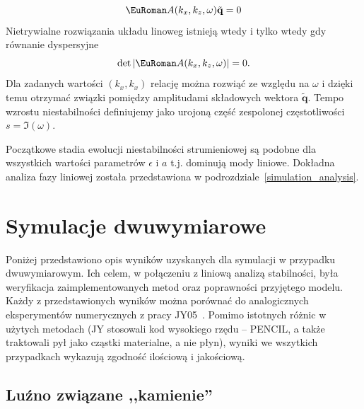 \begin{equation}
 \eurom{A}(k_x,k_z,\omega)\tilde{\mathbf{q}} = 0
 \label{eq:linset}
\end{equation}
%
Nietrywialne rozwiązania układu linoweg  istnieją wtedy i tylko
wtedy gdy równanie dyspersyjne 
\begin{equation}
 \det|\eurom{A}(k_x,k_z,\omega)|=0.
 \label{eq:disprel}
\end{equation}
%
Dla zadanych wartości $(k_x, k_x)$ relację  można rozwiąć ze
względu na $\omega$ i dzięki temu otrzymać związki pomiędzy amplitudami
składowych wektora $\tilde{\mathbf{q}}$.
Tempo wzrostu niestabilności definiujemy jako urojoną część zespolonej
częstotliwości $s=\Im(\omega)$.
%

Początkowe stadia ewolucji niestabilności strumieniowej są podobne dla
wszystkich wartości parametrów $\epsilon$ i $a$ t.j. dominują mody liniowe.
Dokładna analiza fazy liniowej została przedstawiona w
podrozdziale~\ref{simulation_analysis}.


\section{Symulacje dwuwymiarowe}
Poniżej przedstawiono opis wyników uzyskanych dla symulacji w przypadku
dwuwymiarowym. Ich celem, w połączeniu z liniową analizą stabilności, była
weryfikacja zaimplementowanych metod oraz poprawności przyjętego modelu. Każdy z
przedstawionych wyników można porównać do analogicznych eksperymentów
numerycznych z pracy JY05~\cite{JY05}. Pomimo istotnych różnic w użytych
metodach (JY stosowali kod wysokiego rzędu -- PENCIL, a także traktowali pył
jako cząstki materialne, a nie płyn), wyniki we wszytkich przypadkach wykazują
zgodność ilościową i jakościową.

\subsection{Luźno związane ,,kamienie''}%

